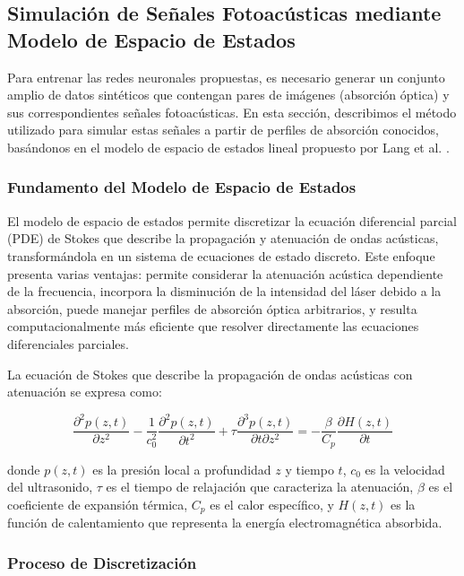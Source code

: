 \subsection{Simulación de Señales Fotoacústicas mediante Modelo de Espacio de Estados} \label{sec:simulacion}


Para entrenar las redes neuronales propuestas, es necesario generar un conjunto amplio de datos sintéticos que contengan pares de imágenes (absorción óptica) y sus correspondientes señales fotoacústicas. En esta sección, describimos el método utilizado para simular estas señales a partir de perfiles de absorción conocidos, basándonos en el modelo de espacio de estados lineal propuesto por Lang et al. \cite{Lang2017}.

\subsubsection{Fundamento del Modelo de Espacio de Estados}

El modelo de espacio de estados permite discretizar la ecuación diferencial parcial (PDE) de Stokes que describe la propagación y atenuación de ondas acústicas, transformándola en un sistema de ecuaciones de estado discreto. Este enfoque presenta varias ventajas: permite considerar la atenuación acústica dependiente de la frecuencia, incorpora la disminución de la intensidad del láser debido a la absorción, puede manejar perfiles de absorción óptica arbitrarios, y resulta computacionalmente más eficiente que resolver directamente las ecuaciones diferenciales parciales.

La ecuación de Stokes que describe la propagación de ondas acústicas con atenuación se expresa como:

\begin{equation}
    \frac{\partial^2 p(z,t)}{\partial z^2} - \frac{1}{c_0^2}\frac{\partial^2 p(z,t)}{\partial t^2} + \tau\frac{\partial^3 p(z,t)}{\partial t \partial z^2} = -\frac{\beta}{C_p}\frac{\partial H(z,t)}{\partial t}
\end{equation}

donde $p(z,t)$ es la presión local a profundidad $z$ y tiempo $t$, $c_0$ es la velocidad del ultrasonido, $\tau$ es el tiempo de relajación que caracteriza la atenuación, $\beta$ es el coeficiente de expansión térmica, $C_p$ es el calor específico, y $H(z,t)$ es la función de calentamiento que representa la energía electromagnética absorbida.

\subsubsection{Proceso de Discretización}

